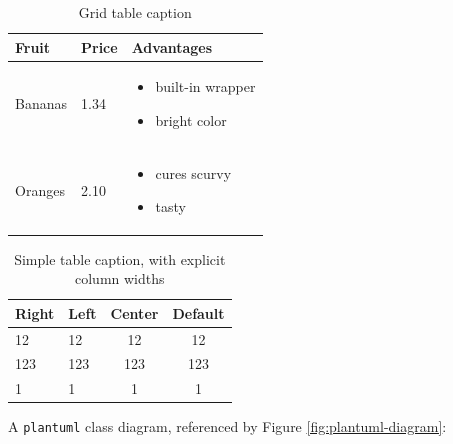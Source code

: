 \documentclass[a4paper, 11pt]{article}
\begin{document}
    \begin{table}[h]
        \caption{Grid table caption}
        \label{tab:my-grid-table}
        \centering
        \begin{tabular}{|p{}|p{}|p{}|}
            \hline
            \bfseries{Fruit} &
            \bfseries{Price} &
            \bfseries{Advantages} \\
            \hline
            Bananas &
            1.34 &
            
    \begin{itemize}
        \item built-in wrapper
        \item bright color
    \end{itemize} \\
            \hline
            Oranges &
            2.10 &
            
    \begin{itemize}
        \item cures scurvy
        \item tasty
    \end{itemize} \\
            \hline
        \end{tabular}
    \end{table}

    \begin{table}[h]
        \caption{Simple table caption, with explicit column widths}
        \label{tab:my-simple-table-explicit}
        \centering
        \begin{tabular}{|p{2cm}|p{1cm}|c|c|}
            \hline
            \bfseries{Right} &
            \bfseries{Left} &
            \bfseries{Center} &
            \bfseries{Default} \\
            \hline
            12 &
            12 &
            12 &
            12 \\
            \hline
            123 &
            123 &
            123 &
            123 \\
            \hline
            1 &
            1 &
            1 &
            1 \\
            \hline
        \end{tabular}
    \end{table}

    A \texttt{plantuml} class diagram, referenced by Figure
    \ref{fig:plantuml-diagram}:
\end{document}
